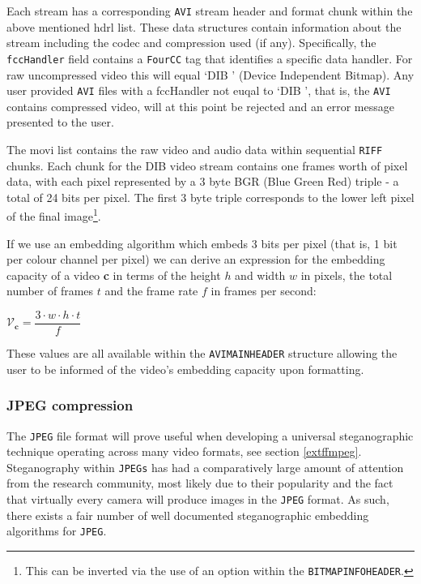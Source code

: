\documentclass[paper=a4, fontsize=11pt,twoside]{scrartcl}    %
\numberwithin{table}{section}
\numberwithin{figure}{section}
\numberwithin{algorithm}{section}
\begin{document}
\noindent
Each stream has a corresponding \texttt{AVI} stream header and format chunk within the above mentioned hdrl list. These data structures contain information about the stream including the codec and compression used (if any). Specifically, the \texttt{fccHandler} field contains a \texttt{FourCC} tag that identifies a specific data handler. For raw uncompressed video this will equal `DIB ' (Device Independent Bitmap). Any user provided \texttt{AVI} files with a fccHandler not euqal to `DIB ', that is, the \texttt{AVI} contains compressed video, will at this point be rejected and an error message presented to the user.

The movi list contains the raw video and audio data within sequential \texttt{RIFF} chunks. Each chunk for the DIB video stream contains one frames worth of pixel data, with each pixel represented by a 3 byte BGR (Blue Green Red) triple - a total of 24 bits per pixel. The first 3 byte triple corresponds to the lower left pixel of the final image\footnote{This can be inverted via the use of an option within the \texttt{BITMAPINFOHEADER}.}. 

If we use an embedding algorithm which embeds 3 bits per pixel (that is, 1 bit per colour channel per pixel) we can derive an expression for the embedding capacity of a video \textbf{c} in terms of the height $h$ and width $w$ in pixels, the total number of frames $t$ and the frame rate $f$ in frames per second:
\begin{center}
	$\mathcal{V} _{\textbf{c}} = \dfrac{3 \cdot w \cdot h \cdot t}{f}$
\end{center}  
\noindent
These values are all available within the \texttt{AVIMAINHEADER} structure allowing the user to be informed of the video's embedding capacity upon formatting.

\subsubsection{JPEG compression}
\label{jpeg}

The \texttt{JPEG} file format will prove useful when developing a universal steganographic technique operating across many video formats, see section \ref{extffmpeg}. Steganography within \texttt{JPEGs} has had a comparatively large amount of attention from the research community, most likely due to their popularity and the fact that virtually every camera will produce images in the \texttt{JPEG} format. As such, there exists a fair number of well documented steganographic embedding algorithms for \texttt{JPEG}.
\end{document}
